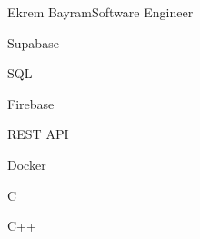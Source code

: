 \documentclass{article}
\begin{document}
\begin{cv}[avatar]{Ekrem Bayram}{Software Engineer}
    \cvseparator
    \begin{cvitem}
        Supabase
    \end{cvitem}

    \cvseparator
    \begin{cvitem}
        SQL
    \end{cvitem}

    \cvseparator
    \begin{cvitem}
        Firebase
    \end{cvitem}

    \cvseparator
    \begin{cvitem}
        REST API
    \end{cvitem}

    \cvseparator
    \begin{cvitem}
        Docker
    \end{cvitem}

    \cvseparator
    \begin{cvitem}
        C
    \end{cvitem}

    \cvseparator
    \begin{cvitem}
        C++
    \end{cvitem}





\end{cv}
\end{document}
